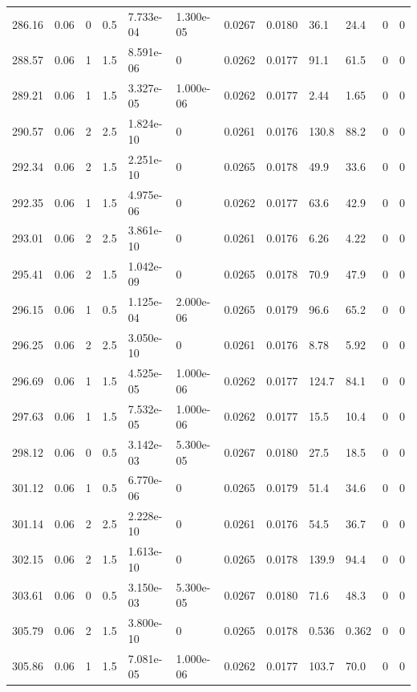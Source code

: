 \documentclass[preview]{standalone}
\begin{document}
{{{{{\begin{tabular}{L{1.2cm}C{1.2cm} C{0.3cm}C{0.5cm} C{1.4cm}C{1.4cm} C{1.4cm}C{1.4cm} C{1.6cm}C{1.6cm} C{1.6cm}C{1.6cm}}
  286.16  &  0.06  & 0     & 0.5 &  7.733e-04  & 1.300e-05  &  0.0267&   0.0180& 36.1 & 24.4   &  0 & 0  \\ 
  288.57  &  0.06  & 1     & 1.5 &  8.591e-06  & 0  &  0.0262&   0.0177& 91.1 & 61.5   &  0 & 0  \\ 
  289.21  &  0.06  & 1     & 1.5 &  3.327e-05  & 1.000e-06  &  0.0262&   0.0177& 2.44 & 1.65   &  0 & 0  \\ 
  290.57  &  0.06  & 2     & 2.5 &  1.824e-10  & 0  &  0.0261&   0.0176& 130.8 & 88.2   &  0 & 0  \\ 
  292.34  &  0.06  & 2     & 1.5 &  2.251e-10  & 0  &  0.0265&   0.0178& 49.9 & 33.6   &  0 & 0  \\ 
  292.35  &  0.06  & 1     & 1.5 &  4.975e-06  & 0  &  0.0262&   0.0177& 63.6 & 42.9   &  0 & 0  \\ 
  293.01  &  0.06  & 2     & 2.5 &  3.861e-10  & 0  &  0.0261&   0.0176& 6.26 & 4.22   &  0 & 0  \\ 
  295.41  &  0.06  & 2     & 1.5 &  1.042e-09  & 0  &  0.0265&   0.0178& 70.9 & 47.9   &  0 & 0  \\ 
  296.15  &  0.06  & 1     & 0.5 &  1.125e-04  & 2.000e-06  &  0.0265&   0.0179& 96.6 & 65.2   &  0 & 0  \\ 
  296.25  &  0.06  & 2     & 2.5 &  3.050e-10  & 0  &  0.0261&   0.0176& 8.78 & 5.92   &  0 & 0  \\ 
  296.69  &  0.06  & 1     & 1.5 &  4.525e-05  & 1.000e-06  &  0.0262&   0.0177& 124.7 & 84.1   &  0 & 0  \\ 
  297.63  &  0.06  & 1     & 1.5 &  7.532e-05  & 1.000e-06  &  0.0262&   0.0177& 15.5 & 10.4   &  0 & 0  \\ 
  298.12  &  0.06  & 0     & 0.5 &  3.142e-03  & 5.300e-05  &  0.0267&   0.0180& 27.5 & 18.5   &  0 & 0  \\ 
  301.12  &  0.06  & 1     & 0.5 &  6.770e-06  & 0  &  0.0265&   0.0179& 51.4 & 34.6   &  0 & 0  \\ 
  301.14  &  0.06  & 2     & 2.5 &  2.228e-10  & 0  &  0.0261&   0.0176& 54.5 & 36.7   &  0 & 0  \\ 
  302.15  &  0.06  & 2     & 1.5 &  1.613e-10  & 0  &  0.0265&   0.0178& 139.9 & 94.4   &  0 & 0  \\ 
  303.61  &  0.06  & 0     & 0.5 &  3.150e-03  & 5.300e-05  &  0.0267&   0.0180& 71.6 & 48.3   &  0 & 0  \\ 
  305.79  &  0.06  & 2     & 1.5 &  3.800e-10  & 0  &  0.0265&   0.0178& 0.536 & 0.362   &  0 & 0  \\ 
  305.86  &  0.06  & 1     & 1.5 &  7.081e-05  & 1.000e-06  &  0.0262&   0.0177& 103.7 & 70.0   &  0 & 0  \\ 

\end{tabular}}}}}}
\end{document}
